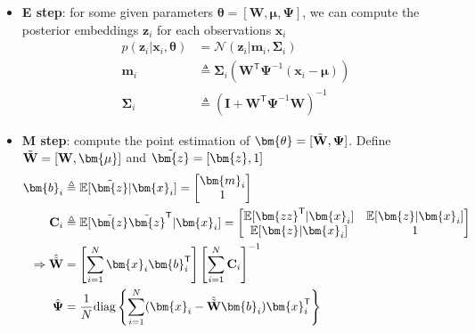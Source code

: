 \begin{example}\label{example:em4fa}
$~$
    \begin{itemize}
        \item \textbf{E step}: for some given parameters $\bm{\theta}=[\mathbf{W},\bm{\mu},\mathbf{\Psi}]$,
        we can compute the posterior embeddings $\bm{z}_i$ for each observations $\bm{x}_i$
        \begin{align}
            p(\bm{z}_i|\bm{x}_i,\bm{\theta}) & = \mathcal{N}(\bm{z}_i|\bm{m}_i,\mathbf{\Sigma}_i) \\
            \bm{m}_i & \triangleq \mathbf{\Sigma}_i(\mathbf{W}^\mathsf{T}\mathbf{\Psi}^{-1}(\bm{x}_i-\bm{\mu})) \\
            \mathbf{\Sigma}_i & \triangleq (\mathbf{I} + \mathbf{W}^\mathsf{T}\mathbf{\Psi}^{-1}\mathbf{W})^{-1}
        \end{align}

        \item \textbf{M step}: compute the point estimation of $\bm{\theta}=[\Tilde{\mathbf{W}},\mathbf{\Psi}]$. 
        Define $\Tilde{\mathbf{W}}=[\mathbf{W},\bm{\mu}]$ and $\Tilde{\bm{z}}=[\bm{z},1]$
        \begin{align}
            \bm{b}_i & \triangleq \mathbb{E}[\Tilde{\bm{z}}|\bm{x}_i]=\begin{bmatrix}
                \bm{m}_i \\ 1
            \end{bmatrix} \\
            \mathbf{C}_i & \triangleq \mathbb{E}[\Tilde{\bm{z}}\Tilde{\bm{z}}^\mathsf{T}|\bm{x}_i] = \begin{bmatrix}
                \mathbb{E}[\bm{zz}^\mathsf{T}|\bm{x}_i] &\mathbb{E}[\bm{z}|\bm{x}_i] \\
                \mathbb{E}[\bm{z}|\bm{x}_i] & 1
            \end{bmatrix} \\
            \Rightarrow \hat{\Tilde{\mathbf{W}}} & = \left[
                \sum_{i=1}^N\bm{x}_i\bm{b}_i^\mathsf{T}
            \right]\left[
                \sum_{i=1}^N\mathbf{C}_i
            \right]^{-1} \\
            \hat{\mathbf{\Psi}} & = \frac{1}{N}\mathrm{diag}\left\{
            \sum_{i=1}^N(\bm{x}_i-\hat{\Tilde{\mathbf{W}}}\bm{b}_i)\bm{x}_i^\mathsf{T}
            \right\}
        \end{align}
    \end{itemize}
\end{example}


